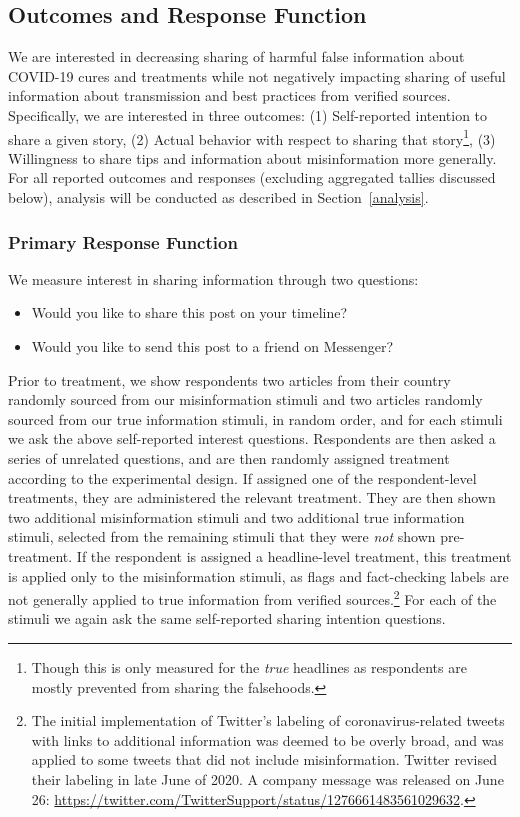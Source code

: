 \documentclass[letterpaper, 12pt, parskip=full,]{scrartcl}
\begin{document}



\subsection{Outcomes and Response Function}

We are interested in decreasing sharing of harmful false information about COVID-19 cures and treatments while not negatively impacting sharing of useful information about transmission and best practices from verified sources. Specifically, we are interested in three outcomes: (1) Self-reported intention to share a given story, (2) Actual behavior with respect to sharing that story\footnote{Though this is only measured for the \textit{true} headlines as respondents are mostly prevented from sharing the falsehoods.}, (3) Willingness to share tips and information about misinformation more generally. For all reported outcomes and responses (excluding aggregated tallies discussed below), analysis will be conducted as described in Section~\ref{analysis}.  

\subsubsection{Primary Response Function}

We measure interest in sharing information through two questions:
\begin{itemize}
\item Would you like to share this post on your timeline? 
\item Would you like to send this post to a friend on Messenger?
\end{itemize}

Prior to treatment, we show respondents two articles from their country randomly sourced from our misinformation stimuli and two articles randomly sourced from our true information stimuli, in random order, and for each stimuli we ask the above self-reported interest questions. Respondents are then asked a series of unrelated questions, and are then randomly assigned treatment according to the experimental design. If assigned one of the respondent-level treatments, they are administered the relevant treatment. They are then shown two additional misinformation stimuli and two additional true information stimuli, selected from the remaining stimuli that they were \textit{not} shown pre-treatment. If the respondent is assigned a headline-level treatment, this treatment is applied only to the misinformation stimuli, as flags and fact-checking labels are not generally applied to true information from verified sources.\footnote{The initial implementation of Twitter's labeling of coronavirus-related tweets with links to additional information was deemed to be overly broad, and was applied to some tweets that did not include misinformation. Twitter revised their labeling in late June of 2020. A company message was released on June 26: \url{https://twitter.com/TwitterSupport/status/1276661483561029632}. } For each of the stimuli we again ask the same self-reported sharing intention questions. 
\end{document}
